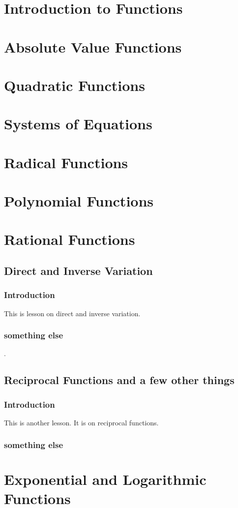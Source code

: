 \documentclass[12pt,letterpaper]{memoir}
\begin{document}
\checkandfixthelayout
\forPAP

\pagestyle{myPagestyle}

\frontmatter
\tableofcontents*

\mainmatter
{} 
\part{Introduction to Functions}
\part{Absolute Value Functions}
\part{Quadratic Functions}
\part{Systems of Equations}

\part{Radical Functions}
\part{Polynomial Functions}
\part{Rational Functions}

\chapter{Direct and Inverse Variation}
\section{Introduction}
This is lesson on direct and inverse variation.

\section{something else}
\Blindtext.

\chapter{Reciprocal Functions and a few other things}

\section{Introduction}
This is another lesson. It is on reciprocal functions.

\section{something else}
\Blindtext
\Blindtext
\Blindtext

\part{Exponential and Logarithmic Functions}

\forOL
{}

\forPAP
{}
\end{document}
